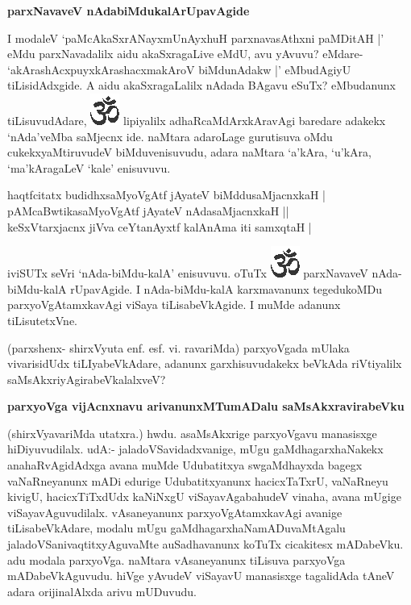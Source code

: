 {\bf parxNavaveV nAdabiMdukalArUpavAgide}

I modaleV `paMcAkaSxrANayxmUnAyxhuH parxnavasAthxni paMDitAH |' eMdu parxNavadalilx aidu akaSxragaLive eMdU, avu yAvuvu? eMdare- `akArashAcxpuyxkArashacxmakAroV biMdunAdakw |' eMbudAgiyU tiLisidAdxgide. A aidu akaSxragaLalilx nAdada BAgavu eSuTx? eMbudanunx tiLisuvudAdare, {\includegraphics[scale=.6]{om.eps}} lipiyalilx adhaRcaMdArxkAravAgi baredare adakekx `nAda'veMba saMjecnx ide. naMtara adaroLage gurutisuva oMdu cukekxyaMtiruvudeV biMduvenisuvudu, adara naMtara `a'kAra, `u'kAra, `ma'kAragaLeV `kale' enisuvuvu. 

\begin{shloka}
haqtfcitatx budidhxsaMyoVgAtf jAyateV biMddusaMjacnxkaH |\\
pAMcaBwtikasaMyoVgAtf jAyateV nAdasaMjacnxkaH ||\\
keSxVtarxjacnx jiVva ceYtanAyxtf kalAnAma iti samxqtaH |
\end{shloka}

iviSUTx seVri `nAda-biMdu-kalA' enisuvuvu. oTuTx {\includegraphics[scale=.6]{om.eps}} parxNavaveV nAda-biMdu-kalA rUpavAgide. I nAda-biMdu-kalA karxmavanunx tegedukoMDu parxyoVgAtamxkavAgi viSaya tiLisabeVkAgide. I muMde adanunx tiLisutetxVne.

(parxshenx- shirxVyuta enf. esf. vi. ravariMda) parxyoVgada mUlaka vivarisidUdx tiLIyabeVkAdare, adanunx garxhisuvudakekx beVkAda riVtiyalilx saMsAkxriyAgirabeVkalalxveV?

{\bf parxyoVga vijAcnxnavu arivanunxMTumADalu saMsAkxravirabeVku}

(shirxVyavariMda utatxra.) hwdu. asaMsAkxrige parxyoVgavu manasisxge hiDiyuvudilalx. udA:- jaladoVSavidadxvanige, mUgu gaMdhagarxhaNakekx anahaRvAgidAdxga avana muMde Udubatitxya swgaMdhayxda bagegx vaNaRneyanunx mADi edurige Udubatitxyanunx hacicxTaTxrU, vaNaRneyu kivigU, hacicxTiTxdUdx kaNiNxgU viSayavAgabahudeV vinaha, avana mUgige viSayavAguvudilalx. vAsaneyanunx parxyoVgAtamxkavAgi avanige tiLisabeVkAdare, modalu mUgu gaMdhagarxhaNamADuvaMtAgalu jaladoVSanivaqtitxyAguvaMte auSadhavanunx koTuTx cicakitesx mADabeVku. adu modala parxyoVga. naMtara vAsaneyanunx tiLisuva parxyoVga mADabeVkAguvudu. hiVge yAvudeV viSayavU manasisxge tagalidAda tAneV adara orijinalAlxda arivu mUDuvudu.

